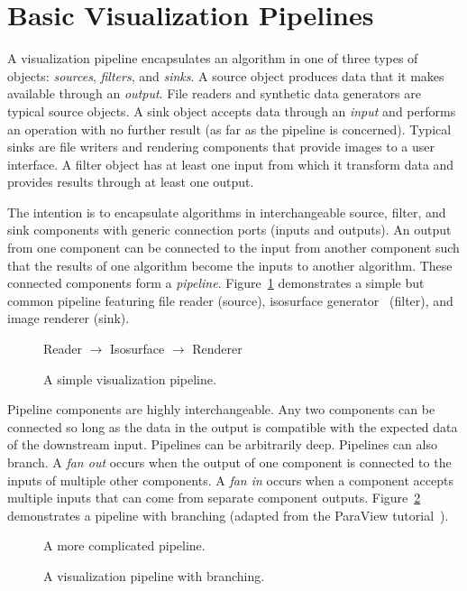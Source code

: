 \documentclass{article}
\newcommand*{\lcite}[1]{~\cite{#1}}
\newcommand*{\keyterm}[1]{\emph{#1}}
\begin{document}
\section{Basic Visualization Pipelines}
\label{sec:BasicVisualizationPipelines}

A visualization pipeline encapsulates an algorithm in one of three types of
objects: \keyterm{sources}, \keyterm{filters}, and \keyterm{sinks}.  A
source object produces data that it makes available through an
\keyterm{output}.  File readers and synthetic data generators are typical
source objects.  A sink object accepts data through an \keyterm{input} and
performs an operation with no further result (as far as the pipeline is
concerned).  Typical sinks are file writers and rendering components that
provide images to a user interface.  A filter object has at least one input
from which it transform data and provides results through at least one
output.

The intention is to encapsulate algorithms in interchangeable source,
filter, and sink components with generic connection ports (inputs and
outputs).  An output from one component can be connected to the input from
another component such that the results of one algorithm become the inputs
to another algorithm.  These connected components form a
\keyterm{pipeline}.  Figure~\ref{fig:SimplePipeline} demonstrates a simple
but common pipeline featuring file reader (source), isosurface
generator\lcite{Lorensen1987} (filter), and image renderer (sink).

\begin{figure}[htbp]
  \centering
  Reader $\rightarrow$ Isosurface $\rightarrow$ Renderer
  \caption{A simple visualization pipeline.}
  \label{fig:SimplePipeline}
\end{figure}

Pipeline components are highly interchangeable.  Any two components can be
connected so long as the data in the output is compatible with the expected
data of the downstream input.  Pipelines can be arbitrarily deep.
Pipelines can also branch.  A \keyterm{fan out} occurs when the output of
one component is connected to the inputs of multiple other components.  A
\keyterm{fan in} occurs when a component accepts multiple inputs that can
come from separate component outputs.  Figure~\ref{fig:ComplicatedPipeline}
demonstrates a pipeline with branching (adapted from the ParaView
tutorial\lcite{ParaViewTutorial}).

\begin{figure}[htbp]
  \centering
  A more complicated pipeline.
  \caption{A visualization pipeline with branching.}
  \label{fig:ComplicatedPipeline}
\end{figure}
\end{document}
